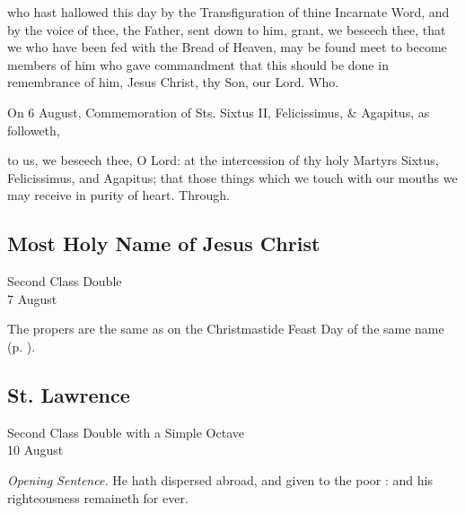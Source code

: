 
\postcommunion
{} who hast hallowed this day by the Transfiguration of thine Incarnate Word, and by the voice of thee, the Father, sent down to him, grant, we beseech thee, that we who have been fed with the Bread of Heaven, may be found meet to become members of him who gave commandment that this should be done in remembrance of him, Jesus Christ, thy Son, our Lord. Who.
\begin{rubric}
	 On 6 August, Commemoration of Sts. Sixtus II, Felicissimus, \& Agapitus, as followeth,
\end{rubric}
 to us, we beseech thee, O Lord: at the intercession of thy holy Martyrs Sixtus, Felicissimus, and Agapitus; that those things which we touch with our mouths we may receive in purity of heart. Through.


\subsection{Most Holy Name of Jesus Christ}
\begin{inhead}
    {Second Class Double\\
7 August}
\end{inhead}
\begin{rubric}
    The propers are the same as on the Christmastide Feast Day of the same name (p. \pageref{MostHolyName}).
\end{rubric}


\clearpage
\subsection{St. Lawrence}
\begin{inhead}
    {Second Class Double with a Simple Octave\\
10 August}
\end{inhead}
\par\noindent
\textit{Opening Sentence.} He hath dispersed abroad, and given to the poor : and his righteousness remaineth for ever.

